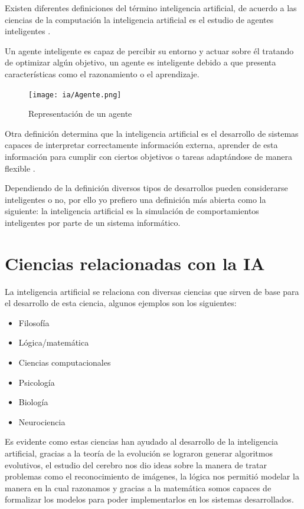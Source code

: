 \documentclass[11pt,fleqn]{book} %
\begin{document}
Existen diferentes definiciones del término inteligencia artificial, de acuerdo a las ciencias de la computación la inteligencia artificial es el estudio de agentes inteligentes \cite{logical_approach}.

Un agente inteligente es capaz de percibir su entorno y actuar sobre él tratando de optimizar algún objetivo, un agente es inteligente debido a que presenta características como el razonamiento o el aprendizaje.

\begin{figure}[ht]
\centering\texttt{[image: ia/Agente.png]}
\caption{Representación de un agente}
\label{fig:agente} 
\end{figure}

Otra definición determina que la inteligencia artificial es el desarrollo de sistemas capaces de interpretar correctamente información externa, aprender de esta información para cumplir con ciertos objetivos o tareas adaptándose de manera flexible \cite{KAPLAN201915}.

Dependiendo de la definición diversos tipos de desarrollos pueden considerarse inteligentes o no, por ello yo prefiero una definición más abierta como la siguiente: la inteligencia artificial es la simulación de comportamientos inteligentes por parte de un sistema informático.

\section{Ciencias relacionadas con la IA} 
La inteligencia artificial se relaciona con diversas ciencias que sirven de base para el desarrollo de esta ciencia, algunos ejemplos son los siguientes:

\begin{itemize}
\item Filosofía
\item Lógica/matemática
\item Ciencias computacionales
\item Psicología
\item Biología
\item Neurociencia
\end{itemize}

Es evidente como estas ciencias han ayudado al desarrollo de la inteligencia artificial, gracias a la teoría de la evolución se lograron generar algoritmos evolutivos, el estudio del cerebro nos dio ideas sobre la manera de tratar problemas como el reconocimiento de imágenes, la lógica nos permitió modelar la manera en la cual razonamos y gracias a la matemática somos capaces de formalizar los modelos para poder implementarlos en los sistemas desarrollados.
\end{document}
